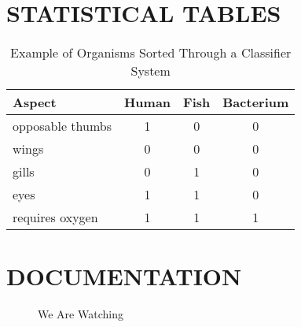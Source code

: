 \documentclass{strrespaper-trad}
\begin{document}
    \section{STATISTICAL TABLES}
	    \begin{table}[htbp]
	        \centering
	        \begin{tabular}{lccc}
	            \toprule
	            Aspect           & Human & Fish & Bacterium \\
	            \midrule
	            opposable thumbs & 1     & 0    & 0         \\
	            wings            & 0     & 0    & 0         \\
	            gills            & 0     & 1    & 0         \\
	            eyes             & 1     & 1    & 0         \\
	            requires oxygen  & 1     & 1    & 1         \\
	            \bottomrule
	        \end{tabular}
	        \caption{Example of Organisms Sorted Through a Classifier System}
	        \label{tab:ex_classifier}
	    \end{table}

    \section{DOCUMENTATION}
	    \begin{figure}[htbp]
	        \centering
	         \qquad

	        \quad

	         \qquad
	        \caption{We Are Watching}
	        \label{fig:waw}
	    \end{figure}
\end{document}
